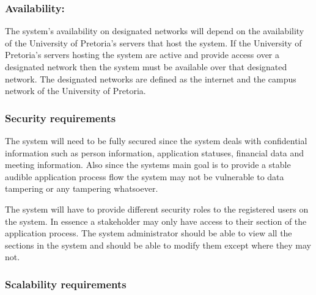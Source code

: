 \documentclass[12pt]{article}
\begin{document}
		\subsubsection{Availability:}
				
		\begin{flushleft}
		
		The system's availability on designated networks will depend on the availability of the University of Pretoria's servers that host the system. If the University of Pretoria's servers hosting the system are active and provide access over a designated network then the system must be available over that designated network. The designated networks are defined as the internet and the campus network of the University of Pretoria.
		
		\end{flushleft}
		
		\vspace{0.1in}
				
		\subsubsection{Security requirements}
		
		\begin{flushleft}
		
		The system will need to be fully secured since the system deals with confidential information such as person information, application statuses, financial data and meeting information. Also since the systems main goal is to provide a stable audible application process flow the system may not be vulnerable to data tampering or any tampering whatsoever. \\
		\vspace{0.1in}
		  
		The system will have to provide different security roles to the registered users on the system. In essence a stakeholder may only have access to their section of the application process. The system administrator should be able to view all the sections in the system and should be able to modify them except where they may not.
		
		\end{flushleft}
		
		\vspace{0.1in}
		
		\subsubsection{Scalability requirements}
		
\end{document}

